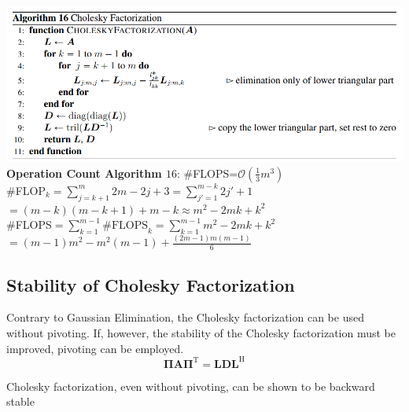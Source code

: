\documentclass[english]{latex4ei/latex4ei_sheet}
\begin{document}
\begin{sectionbox}
\includegraphics[width=\textwidth]{img/algo16_cholesky.PNG}
\textbf{Operation Count Algorithm $16$}: \#FLOPS=$\mathcal{O}(\frac{1}{3}m^3)$\\
\#FLOP$_k = \sum_{j=k+1}^{m} 2m-2j+3 = \sum_{j'=1}^{m-k}2j'+1$\\
$=(m-k)(m-k+1)+m-k\approx m^2-2mk+k^2$\\

\#FLOPS$=\sum_{k=1}^{m-1}\text{\#FLOPS}_k = \sum_{k=1}^{m-1}m^2-2mk+k^2$\\
$=(m-1)m^2-m^2(m-1)+\frac{(2m-1)m(m-1)}{6}$
\end{sectionbox}
\begin{sectionbox}
\subsection{Stability of Cholesky Factorization}
Contrary to Gaussian Elimination, the Cholesky factorization can be used without pivoting. If, however, the stability of the Cholesky factorization must be improved, pivoting can be employed.
$$\mathbf{\Pi}\mathbf{A}\mathbf{\Pi}^\text{T} = \mathbf{L}\mathbf{D}\mathbf{L}^\text{H}$$
\begin{emphbox}
	\large Cholesky factorization, even without pivoting, can be shown to be backward stable
\end{emphbox}
\end{sectionbox}
\end{document}

